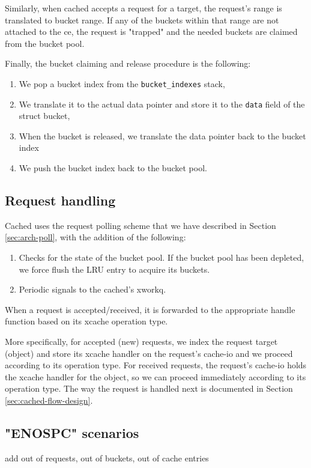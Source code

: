 Similarly, when cached accepts a request for a target, the request's range is 
translated to bucket range. If any of the buckets within that range are not 
attached to the ce, the request is "trapped" and the needed buckets are claimed 
from the bucket pool.

Finally, the bucket claiming and release procedure is the following:
\begin{enumerate}
\item We pop a bucket index from the \texttt{bucket\_indexes} stack,
\item We translate it to the actual data pointer and store it to the 
	\texttt{data} field of the struct bucket,
\item When the bucket is released, we translate the data pointer back to the 
	bucket index
\item We push the bucket index back to the bucket pool.
\end{enumerate}

\subsection{Request handling}

Cached uses the request polling scheme that we have described in Section 
\ref{sec:arch-poll}, with the addition of the following:

\begin{enumerate}
	\item Checks for the state of the bucket pool. If the bucket pool has 
		been depleted, we force flush the LRU entry to acquire its 
		buckets.
	\item Periodic signals to the cached's xworkq.
\end{enumerate}

When a request is accepted/received, it is forwarded to the appropriate handle 
function based on its xcache operation type.

More specifically, for accepted (new) requests, we index the request target 
(object) and store its xcache handler on the request's cache-io and we proceed 
according to its operation type. For received requests, the request's cache-io 
holds the xcache handler for the object, so we can proceed immediately 
according to its operation type. The way the request is handled next is 
documented in Section \ref{sec:cached-flow-design}.

\subsection{"ENOSPC" scenarios}

\fixme add out of requests, out of buckets, out of cache entries
